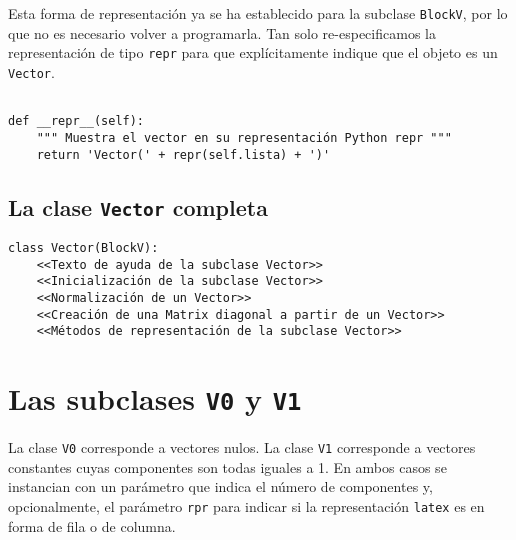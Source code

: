 \documentclass[11pt]{report}
\begin{document}
Esta forma de representación ya se ha establecido para la subclase
\texttt{BlockV}, por lo que no es necesario volver a programarla. Tan solo
re-especificamos la representación de tipo \texttt{repr} para que
explícitamente indique que el objeto es un \texttt{Vector}.

\begin{verbatim}

def __repr__(self):
    """ Muestra el vector en su representación Python repr """
    return 'Vector(' + repr(self.lista) + ')'

\end{verbatim}
\section{La clase \texttt{Vector} completa}
\label{sec:orgbc1421b}

\begin{verbatim}
class Vector(BlockV):
    <<Texto de ayuda de la subclase Vector>>
    <<Inicialización de la subclase Vector>>
    <<Normalización de un Vector>>
    <<Creación de una Matrix diagonal a partir de un Vector>>
    <<Métodos de representación de la subclase Vector>>
\end{verbatim}


\chapter{Las subclases \texttt{V0} y \texttt{V1}}
\label{sec:org71f82ce}

La clase \texttt{V0} corresponde a vectores nulos. La clase \texttt{V1} corresponde
a vectores constantes cuyas componentes son todas iguales a 1. En
ambos casos se instancian con un parámetro que indica el número de
componentes y, opcionalmente, el parámetro \texttt{rpr} para indicar si la
representación \texttt{latex} es en forma de fila o de columna.
\end{document}
